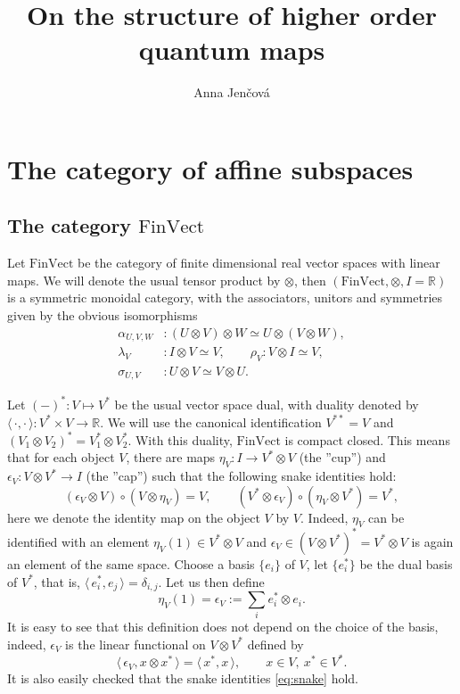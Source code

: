 \documentclass[12pt]{article}
\title{On the structure of  higher order quantum maps}
\author{Anna Jen\v cov\'a}
\theoremstyle{definition}
\theoremstyle{remark}
\def\<{\langle\,}
\def\>{\,\rangle}
\def \FV{\mathrm{FinVect}}
\begin{document}
\maketitle



\section{The category of affine subspaces}

\subsection{The category $\FV$} \label{sec:fv}

Let  $\FV$ be the category of finite dimensional real vector spaces with linear maps. 
We will denote the usual tensor product by $\otimes$, then  $(\FV,\otimes, I=\mathbb R)$
is a symmetric monoidal category, with the associators, unitors and symmetries given by
the obvious isomorphisms 
\begin{align*}
\alpha_{U,V,W}&:(U\otimes V)\otimes W\simeq U\otimes (V\otimes W), \\
\lambda_V&: I\otimes
V\simeq
V, \qquad \rho_V: V\otimes I\simeq V,\\
\sigma_{U,V}&: U\otimes V\simeq V\otimes U.
\end{align*}


Let  $(-)^*: V\mapsto V^*$ be the usual vector space dual, with duality denoted by
$\<\cdot,\cdot\>: V^*\times V\to \mathbb R$. We will use the canonical identification
$V^{**}=V$ and $(V_1\otimes V_2)^*=V_1^*\otimes V_2^*$. With this duality, $\FV$ is
compact closed. This means that for each object $V$, there are maps $\eta_V: I\to V^*\otimes
V$ (the ''cup'') and $\epsilon_V: V\otimes V^*\to I$ (the ''cap'') such that the following snake
identities hold:
\begin{equation}\label{eq:snake}
(\epsilon_V\otimes V)\circ (V\otimes \eta_V)=V,\qquad (V^*\otimes \epsilon_V)\circ
(\eta_V\otimes V^*)=V^*,
\end{equation}
here we denote the identity map on the object $V$ by $V$. Indeed, $\eta_V$ can be
identified with an element $\eta_V(1)\in V^*\otimes V$ and   $\epsilon_V\in (V\otimes
V^*)^*=V^*\otimes V$ is again an element of the same space.  Choose a basis
$\{e_i\}$ of $V$, let $\{e_i^*\}$ be the dual basis of $V^*$, that is,
$\<e_i^*,e_j\>=\delta_{i,j}$. Let us then define
\[
\eta_V(1)=\epsilon_V:=\sum_i e_i^*\otimes e_i.
\]
It is easy to see that this definition does not depend on the choice of the basis, indeed,
$\epsilon_V$ is the linear functional on $V\otimes V^*$ defined by
\[
\<\epsilon_V, x\otimes x^*\>=\<x^*,x\>,\qquad x\in V, \ x^*\in V^*.
\]
It is also easily checked that the snake identities \eqref{eq:snake} hold.
\end{document}
